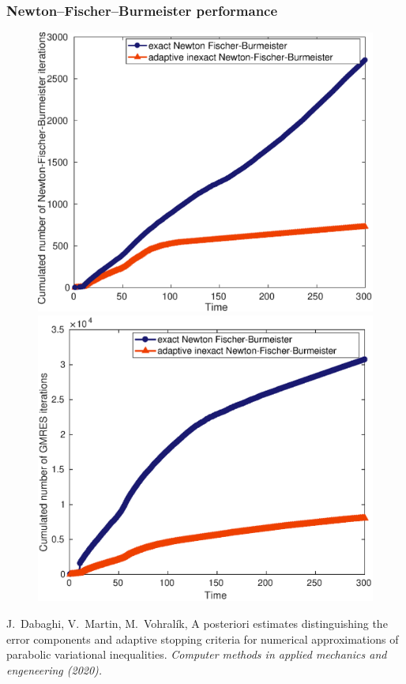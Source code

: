 \begin{frame}
\frametitle{Newton--Fischer--Burmeister performance}
\vspace*{-0.2 cm}
\begin{figure}
\centering
\includegraphics[width=0.45 \textwidth]{fig_article_chap_2/test_case_128/Cumulated_number_Newton_FB_iter_time_gamma_10-3}
\quad
\includegraphics[width=0.45 \textwidth]{fig_article_chap_2/test_case_128/cumulated_number_gmresFB_iter_time_gamma_lin_alg_10-3}
\end{figure}
\vspace*{-0.2 cm}
\begin{thebibliography}{10}
 \scriptsize{
 {\sc J.~Dabaghi, V.~Martin, M.~Vohral\'{i}k}, A posteriori estimates distinguishing the error components and
adaptive stopping criteria for numerical approximations of parabolic variational inequalities.
\em{Computer methods in applied mechanics and engeneering} (2020).
}
 \end{thebibliography}
\end{frame}
%


